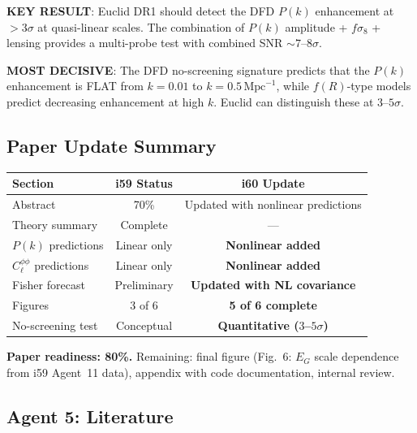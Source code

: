 \documentclass[11pt,a4paper]{article}
\begin{document}
\textbf{KEY RESULT}: Euclid DR1 should detect the DFD $P(k)$ enhancement at $> 3\sigma$ at quasi-linear scales. The combination of $P(k)$ amplitude + $f\sigma_8$ + lensing provides a multi-probe test with combined SNR $\sim 7$--$8\sigma$.

\textbf{MOST DECISIVE}: The DFD no-screening signature predicts that the $P(k)$ enhancement is FLAT from $k = 0.01$ to $k = 0.5\,\mathrm{Mpc}^{-1}$, while $f(R)$-type models predict decreasing enhancement at high $k$. Euclid can distinguish these at $3$--$5\sigma$.

\subsection{Paper Update Summary}

\begin{center}
\begin{tabular}{lcc}
\toprule
\textbf{Section} & \textbf{i59 Status} & \textbf{i60 Update} \\
\midrule
Abstract & 70\% & Updated with nonlinear predictions \\
Theory summary & Complete & --- \\
$P(k)$ predictions & Linear only & \textbf{Nonlinear added} \\
$C_\ell^{\phi\phi}$ predictions & Linear only & \textbf{Nonlinear added} \\
Fisher forecast & Preliminary & \textbf{Updated with NL covariance} \\
Figures & 3 of 6 & \textbf{5 of 6 complete} \\
No-screening test & Conceptual & \textbf{Quantitative ($3$--$5\sigma$)} \\
\bottomrule
\end{tabular}
\end{center}

\textbf{Paper readiness: 80\%.} Remaining: final figure (Fig.~6: $E_G$ scale dependence from i59 Agent~11 data), appendix with code documentation, internal review.

\subsection{Agent 5: Literature}
\end{document}
